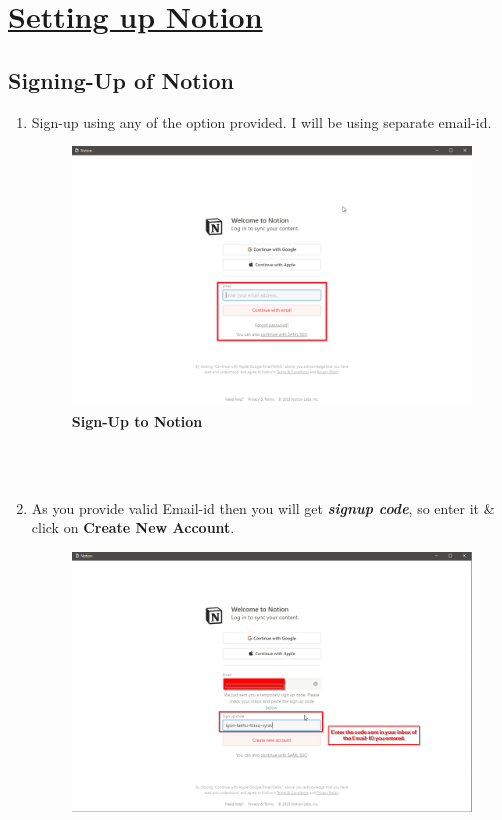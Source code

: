 

\chapter{\underline{Setting up Notion}}
\section{Signing-Up of Notion}
\begin{enumerate}
    \item Sign-up using any of the option provided. I will be using separate email-id.
        \begin{figure}[h]
        \centering
        \includegraphics[scale=0.45,width=\linewidth]{gfx/8.png}
        \caption{\textbf{Sign-Up to Notion}}
        \label{fig_Sign_up_Notion}
        \end{figure} \\ \\ 
    \item As you provide valid Email-id then you will get \textbf{\textit{signup code}}, so enter it \& click on \textbf{Create New Account}.
        \begin{figure}[h]
        \centering
        \includegraphics[scale=0.4]{gfx/9.png}

\end{figure}
\end{enumerate}
